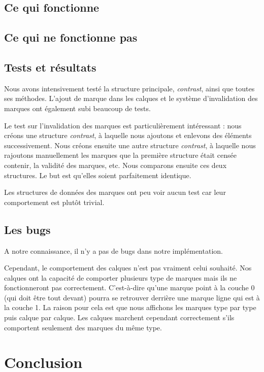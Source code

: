\documentclass[12pt]{article}
\begin{document}
\subsection{Ce qui fonctionne}

\subsection{Ce qui ne fonctionne pas}

\subsection{Tests et résultats}

Nous avons intensivement testé la structure principale, \textit{contrast}, ainsi que toutes ses méthodes.
L'ajout de marque dans les calques et le système d'invalidation des marques ont également subi beaucoup de tests.

Le test sur l'invalidation des marques est particulièrement intéressant : nous créons
une structure \textit{contrast}, à laquelle nous ajoutons et enlevons des éléments
successivement. Nous créons ensuite une autre structure \textit{contrast}, à laquelle
nous rajoutons manuellement les marques que la première structure était censée contenir,
la validité des marques, etc.
Nous comparons ensuite ces deux structures. Le but est qu'elles soient parfaitement identique.

Les structures de données des marques ont peu voir aucun test car leur comportement
est plutôt trivial.

\subsection{Les bugs}

A notre connaissance, il n'y a pas de bugs dans notre implémentation.

Cependant, le comportement des calques n'est pas vraiment celui souhaité.
Nos calques ont la capacité de comporter plusieurs type de marques mais ils ne
fonctionneront pas correctement. C'est-à-dire qu'une marque point à la couche 0 (qui
doit être tout devant) pourra se retrouver derrière une marque ligne qui est à la couche 1.
La raison pour cela est que nous affichons les marques type par type puis calque par
calque.
Les  calques marchent cependant correctement s'ils comportent seulement des marques du même type.

\section{Conclusion}
\end{document}
